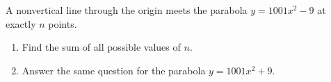 A nonvertical line through the origin meets the parabola $y=1001x^2-9$ at exactly $n$ points.
\begin{enumerate}
\item[(a)] Find the sum of all possible values of $n$.
\item[(b)] Answer the same question for the parabola $y=1001x^2+9$.
\end{enumerate}
